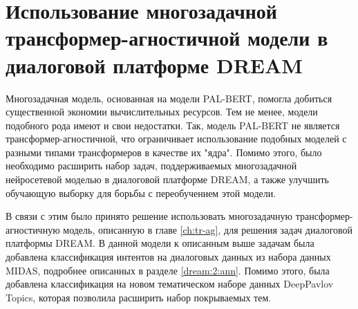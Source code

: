 \section{Использование многозадачной трансформер-агностичной модели в диалоговой платформе DREAM} 

Многозадачная модель, основанная на модели PAL-BERT, помогла добиться существенной экономии вычислительных ресурсов. Тем не менее, модели подобного рода имеют и свои недостатки. Так, модель PAL-BERT не является трансформер-агностичной, что ограничивает использование подобных моделей с разными типами трансформеров в качестве их "ядра". Помимо этого, было необходимо расширить набор задач, поддерживаемых многозадачной нейросетевой моделью в диалоговой платформе DREAM, а также улучшить обучающую выборку для борьбы с переобучением этой модели. 

В связи с этим было принято решение использовать многозадачную трансформер-агностичную модель, описанную в главе \ref{ch:tr-ag}, для решения задач диалоговой платформы DREAM. В данной модели к описанным выше задачам была добавлена классификация интентов на диалоговых данных из набора данных MIDAS, подробнее описанных в разделе \ref{dream:2:ann}. Помимо этого, была добавлена классификация на новом тематическом наборе данных DeepPavlov Topics\cite{dp_topics}, которая позволила расширить набор покрываемых тем. 

